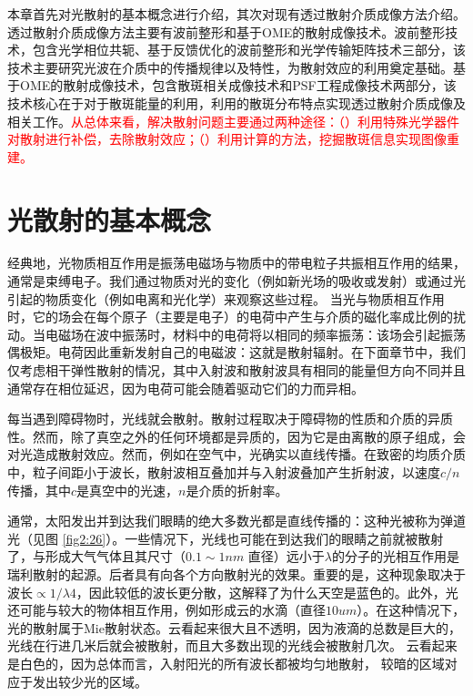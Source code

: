 本章首先对光散射的基本概念进行介绍，其次对现有透过散射介质成像方法介绍。
透过散射介质成像方法主要有波前整形和基于OME的散射成像技术。波前整形技术，包含光学相位共轭、基于反馈优化的波前整形和光学传输矩阵技术三部分，该技术主要研究光波在介质中的传播规律以及特性，为散射效应的利用奠定基础。基于OME的散射成像技术，包含散斑相关成像技术和PSF工程成像技术两部分，该技术核心在于对于散斑能量的利用，利用的散斑分布特点实现透过散射介质成像及相关工作。\textcolor{red}{从总体来看，解决散射问题主要通过两种途径：（）利用特殊光学器件对散射进行补偿，去除散射效应；（）利用计算的方法，挖掘散斑信息实现图像重建。}

\section{光散射的基本概念}

经典地，光物质相互作用是振荡电磁场与物质中的带电粒子共振相互作用的结果，通常是束缚电子。我们通过物质对光的变化（例如新光场的吸收或发射）或通过光引起的物质变化（例如电离和光化学）来观察这些过程。
当光与物质相互作用时，它的场会在每个原子（主要是电子）的电荷中产生与介质的磁化率成比例的扰动。当电磁场在波中振荡时，材料中的电荷将以相同的频率振荡：该场会引起振荡偶极矩。电荷因此重新发射自己的电磁波：这就是散射辐射。在下面章节中，我们仅考虑相干弹性散射的情况，其中入射波和散射波具有相同的能量但方向不同并且通常存在相位延迟，因为电荷可能会随着驱动它们的力而异相。

每当遇到障碍物时，光线就会散射。散射过程取决于障碍物的性质和介质的异质性。然而，除了真空之外的任何环境都是异质的，因为它是由离散的原子组成，会对光造成散射效应。然而，例如在空气中，光确实以直线传播。在致密的均质介质中，粒子间距小于波长，散射波相互叠加并与入射波叠加产生折射波，以速度$c/n$传播，其中$c$是真空中的光速，$n$是介质的折射率\cite{bohren_absorption_2008}。

通常，太阳发出并到达我们眼睛的绝大多数光都是直线传播的：这种光被称为弹道光（见图 \ref{fig2:26}）。一些情况下，光线也可能在到达我们的眼睛之前就被散射了，与形成大气气体且其尺寸（$0.1 \sim 1 nm$ 直径）远小于$\lambda$的分子的光相互作用是瑞利散射的起源。后者具有向各个方向散射光的效果。重要的是，这种现象取决于波长$\propto 1/ \lambda 4$，因此较低的波长更分散，这解释了为什么天空是蓝色的。此外，光还可能与较大的物体相互作用，例如形成云的水滴（直径$10 um$）。在这种情况下，光的散射属于Mie散射状态。云看起来很大且不透明，因为液滴的总数是巨大的，光线在行进几米后就会被散射，而且大多数出现的光线会被散射几次。 云看起来是白色的，因为总体而言，入射阳光的所有波长都被均匀地散射， 较暗的区域对应于发出较少光的区域。


